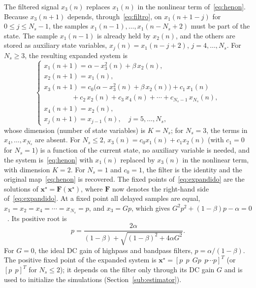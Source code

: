 \documentclass[journal]{IEEEtran}
\begin{document}
The filtered signal $x_3(n)$ replaces $x_1(n)$ in the nonlinear term
of~\eqref{eq:henon}. Because $x_3(n+1)$ depends, through~\eqref{eq:filtro}, on $x_1(n+1-j)$ for
$0 \le j \le N_s - 1$, the samples $x_1(n-1), \dots, x_1(n-N_s+2)$ must be part of the
state. The sample $x_1(n-1)$ is already held by $x_2(n)$, and the others are stored
as auxiliary state variables, $x_j(n) = x_1(n-j+2)$, $j = 4, \dots, N_s$. For $N_s\ge3$, the resulting expanded system
is~\cite{Borges2022sbrt,BorgesCNSNS2024}
\begin{equation}
  \begin{cases}
    x_1(n+1) = \alpha - x_3^2(n) + \beta\, x_2(n), \\
    x_2(n+1) = x_1(n), \\
    x_3(n+1) = c_0\bigl(\alpha - x_3^2(n) + \beta\, x_2(n)\bigr) + c_1\, x_1(n) \\
    \qquad\qquad + c_2\, x_2(n) + c_3\, x_4(n) + \cdots + c_{N_s-1}\, x_{N_s}(n), \\
    x_4(n+1) = x_2(n), \\
    x_j(n+1) = x_{j-1}(n),\quad j = 5,\ldots,N_s,
  \end{cases}
  \label{eq:expandido}
\end{equation}
whose dimension (number of state variables) is $K=N_s$; for $N_s=3$, the terms in $x_4,\ldots,x_{N_s}$
are absent. For $N_s \le 2$, $x_3(n) = c_0 x_1(n) + c_1 x_2(n)$ (with $c_1 = 0$ for $N_s = 1$) is a
function of the current state, no auxiliary variable is needed, and the system
is~\eqref{eq:henon} with $x_1(n)$ replaced by $x_3(n)$ in the nonlinear term, with
dimension $K = 2$.
For $N_s=1$ and $c_0=1$, the filter is the identity and the original
map~\eqref{eq:henon} is recovered. The fixed points of~\eqref{eq:expandido} are the
solutions of $\mathbf{x}^\star=\mathbf{F}(\mathbf{x}^\star)$, where
$\mathbf{F}$ now denotes the right-hand side of~\eqref{eq:expandido}. At a
fixed point all delayed samples are equal, $x_1=x_2=x_4=\cdots=x_{N_s}=p$, and
$x_3=Gp$, which gives $G^2p^2+(1-\beta)p-\alpha=0$~\cite{BorgesCNSNS2024,BorgesTese2026}.
Its positive root is
\begin{equation}
  p = \frac{2\alpha}{(1-\beta)+\sqrt{(1-\beta)^2+4\alpha G^2}}.
  \label{eq:pfixo}
\end{equation}
For $G = 0$, the ideal DC gain of highpass and bandpass filters,
$p = \alpha/(1-\beta)$. The
positive fixed point of the expanded system is
$\mathbf{x}^\star=[p\;\,p\;\,Gp\;\,p\cdots p]^T$ (or
$[p\;\,p]^T$ for $N_s\le2$); it depends on the filter only through its DC
gain $G$ and is used to initialize the simulations
(Section~\ref{sub:estimator}).
\end{document}
